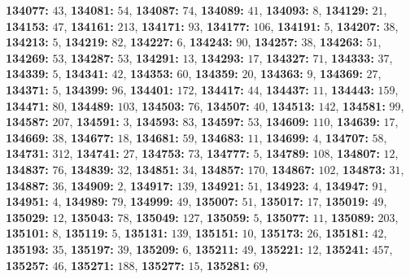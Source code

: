 \textsf{\bfseries 134077:} $43$, \textsf{\bfseries 134081:} $54$, \textsf{\bfseries 134087:} $74$, \textsf{\bfseries 134089:} $41$, \textsf{\bfseries 134093:} $8$, \textsf{\bfseries 134129:} $21$, \textsf{\bfseries 134153:} $47$, \textsf{\bfseries 134161:} $213$, \textsf{\bfseries 134171:} $93$, \textsf{\bfseries 134177:} $106$, \textsf{\bfseries 134191:} $5$, \textsf{\bfseries 134207:} $38$, \textsf{\bfseries 134213:} $5$, \textsf{\bfseries 134219:} $82$, \textsf{\bfseries 134227:} $6$, \textsf{\bfseries 134243:} $90$, \textsf{\bfseries 134257:} $38$, \textsf{\bfseries 134263:} $51$, \textsf{\bfseries 134269:} $53$, \textsf{\bfseries 134287:} $53$, \textsf{\bfseries 134291:} $13$, \textsf{\bfseries 134293:} $17$, \textsf{\bfseries 134327:} $71$, \textsf{\bfseries 134333:} $37$, \textsf{\bfseries 134339:} $5$, \textsf{\bfseries 134341:} $42$, \textsf{\bfseries 134353:} $60$, \textsf{\bfseries 134359:} $20$, \textsf{\bfseries 134363:} $9$, \textsf{\bfseries 134369:} $27$, \textsf{\bfseries 134371:} $5$, \textsf{\bfseries 134399:} $96$, \textsf{\bfseries 134401:} $172$, \textsf{\bfseries 134417:} $44$, \textsf{\bfseries 134437:} $11$, \textsf{\bfseries 134443:} $159$, \textsf{\bfseries 134471:} $80$, \textsf{\bfseries 134489:} $103$, \textsf{\bfseries 134503:} $76$, \textsf{\bfseries 134507:} $40$, \textsf{\bfseries 134513:} $142$, \textsf{\bfseries 134581:} $99$, \textsf{\bfseries 134587:} $207$, \textsf{\bfseries 134591:} $3$, \textsf{\bfseries 134593:} $83$, \textsf{\bfseries 134597:} $53$, \textsf{\bfseries 134609:} $110$, \textsf{\bfseries 134639:} $17$, \textsf{\bfseries 134669:} $38$, \textsf{\bfseries 134677:} $18$, \textsf{\bfseries 134681:} $59$, \textsf{\bfseries 134683:} $11$, \textsf{\bfseries 134699:} $4$, \textsf{\bfseries 134707:} $58$, \textsf{\bfseries 134731:} $312$, \textsf{\bfseries 134741:} $27$, \textsf{\bfseries 134753:} $73$, \textsf{\bfseries 134777:} $5$, \textsf{\bfseries 134789:} $108$, \textsf{\bfseries 134807:} $12$, \textsf{\bfseries 134837:} $76$, \textsf{\bfseries 134839:} $32$, \textsf{\bfseries 134851:} $34$, \textsf{\bfseries 134857:} $170$, \textsf{\bfseries 134867:} $102$, \textsf{\bfseries 134873:} $31$, \textsf{\bfseries 134887:} $36$, \textsf{\bfseries 134909:} $2$, \textsf{\bfseries 134917:} $139$, \textsf{\bfseries 134921:} $51$, \textsf{\bfseries 134923:} $4$, \textsf{\bfseries 134947:} $91$, \textsf{\bfseries 134951:} $4$, \textsf{\bfseries 134989:} $79$, \textsf{\bfseries 134999:} $49$, \textsf{\bfseries 135007:} $51$, \textsf{\bfseries 135017:} $17$, \textsf{\bfseries 135019:} $49$, \textsf{\bfseries 135029:} $12$, \textsf{\bfseries 135043:} $78$, \textsf{\bfseries 135049:} $127$, \textsf{\bfseries 135059:} $5$, \textsf{\bfseries 135077:} $11$, \textsf{\bfseries 135089:} $203$, \textsf{\bfseries 135101:} $8$, \textsf{\bfseries 135119:} $5$, \textsf{\bfseries 135131:} $139$, \textsf{\bfseries 135151:} $10$, \textsf{\bfseries 135173:} $26$, \textsf{\bfseries 135181:} $42$, \textsf{\bfseries 135193:} $35$, \textsf{\bfseries 135197:} $39$, \textsf{\bfseries 135209:} $6$, \textsf{\bfseries 135211:} $49$, \textsf{\bfseries 135221:} $12$, \textsf{\bfseries 135241:} $457$, \textsf{\bfseries 135257:} $46$, \textsf{\bfseries 135271:} $188$, \textsf{\bfseries 135277:} $15$, \textsf{\bfseries 135281:} $69$, 
